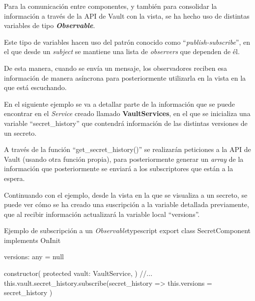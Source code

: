 \documentclass{\ClassPath/viu-tfm-template}
\begin{document}
Para la comunicación entre componentes, y también para consolidar la información a través de la API de Vault con la vista, se ha hecho uso de distintas variables de tipo \textbf{\textit{Observable}}.

Este tipo de variables hacen uso del patrón conocido como “\textit{publish-subscribe}”, en el que desde un \textit{subject} se mantiene una lista de \textit{observers} que dependen de él.

De esta manera, cuando se envía un mensaje, los observadores reciben esa información de manera asíncrona para posteriormente utilizarla en la vista en la que está escuchando.

En el siguiente ejemplo se va a detallar parte de la información que se puede encontrar en el \textit{Service} creado llamado \textbf{VaultServices}, en el que se inicializa una variable “secret\_history” que contendrá información de las distintas versiones de un secreto.

A través de la función “get\_secret\_history()” se realizarán peticiones a la API de Vault (usando otra función propia), para posteriormente generar un \textit{array} de la información que posteriormente se enviará a los subscriptores que están a la espera.


Continuando con el ejemplo, desde la vista en la que se visualiza a un secreto, se puede ver cómo se ha creado una suscripción a la variable detallada previamente, que al recibir información actualizará la variable local “versions”.

\begin{mycode}{Ejemplo de subscripción a un \textit{Observable}}{typescript}{}
export class SecretComponent implements OnInit {
    versions: any = null

    constructor(
        protected vault: VaultService,
    ) {
        //...
        this.vault.secret_history.subscribe(secret_history => {
            this.versions = secret_history
        })
    }
}
\end{mycode}
\end{document}
